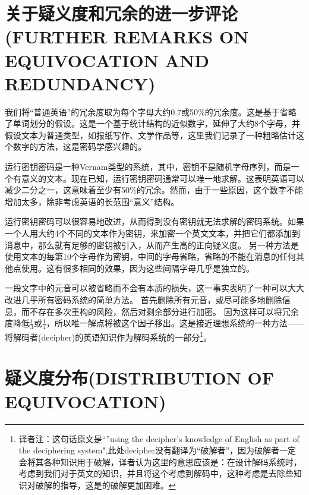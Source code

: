 \documentclass[]{article}
\begin{document}
\newpage
%   
%

\section{关于疑义度和冗余的进一步评论(FURTHER REMARKS ON EQUIVOCATION AND REDUNDANCY)}

我们将“普通英语”的冗余度取为每个字母大约0.7或50\%的冗余度。这是基于省略了单词划分的假设。这是一个基于统计结构的近似数字，延伸了大约8个字母，并假设文本为普通类型，如报纸写作、文学作品等，这里我们记录了一种粗略估计这个数字的方法，这是密码学感兴趣的。

运行密钥密码是一种Vernam类型的系统，其中，密钥不是随机字母序列，而是一个有意义的文本。现在已知，运行密钥密码通常可以唯一地求解。这表明英语可以减少二分之一，这意味着至少有50\%的冗余。然而，由于一些原因，这个数字不能增加太多，除非考虑英语的长范围“意义”结构。

运行密钥密码可以很容易地改进，从而得到没有密钥就无法求解的密码系统。如果一个人用大约4个不同的文本作为密钥，来加密一个英文文本，并把它们都添加到消息中，那么就有足够的密钥被引入，从而产生高的正向疑义度。
另一种方法是使用文本的每第10个字母作为密钥，中间的字母省略，省略的不能在消息的任何其他点使用。这有很多相同的效果，因为这些间隔字母几乎是独立的。

一段文字中的元音可以被省略而不会有本质的损失，这一事实表明了一种可以大大改进几乎所有密码系统的简单方法。
首先删除所有元音，或尽可能多地删除信息，而不存在多次重构的风险，然后对剩余部分进行加密。
因为这样可以将冗余度降低$\frac{1}{3}$或$\frac{1}{4}$，所以唯一解点将被这个因子移出。这是接近理想系统的一种方法——将解码者(decipher)的英语知识作为解码系统的一部分\footnote{译者注：这句话原文是“”using the decipher's knowledge of English as part of the deciphering system",此处decipher没有翻译为“破解者”，因为破解者一定会将其各种知识用于破解，译者认为这里的意思应该是：在设计解码系统时，考虑到我们对于英文的知识，并且将这个考虑到解码中，这种考虑是去除些知识对破解的指导，这是的破解更加困难。}。


\newpage
%   
%

\section{疑义度分布(DISTRIBUTION OF EQUIVOCATION)}
\end{document}
